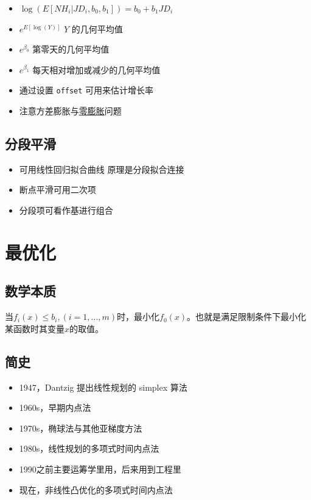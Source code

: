 \documentclass[]{book}
\providecommand{\tightlist}{%
  \setlength{\itemsep}{0pt}\setlength{\parskip}{0pt}}
\begin{document}
\begin{itemize}
\tightlist
\item
  \(\log\left(E[NH_i | JD_i, b_0, b_1]\right) = b_0 + b_1 JD_i\)
\item
  \(e^{E[\log(Y)]}\) \(Y\) 的几何平均值
\item
  \(e^{\beta_0}\) 第零天的几何平均值
\item
  \(e^{\beta_1}\) 每天相对增加或减少的几何平均值
\item
  通过设置 \texttt{offset} 可用来估计增长率
\item
  注意方差膨胀与\href{http://cran.r-project.org/web/packages/pscl/index.html}{零膨胀}问题
\end{itemize}

\section{分段平滑}

\begin{itemize}
\tightlist
\item
  可用线性回归拟合曲线 原理是分段拟合连接
\item
  断点平滑可用二次项
\item
  分段项可看作基进行组合
\end{itemize}

\chapter{最优化}

\section{数学本质}

当\(f_i(x)\leq b_i,(i = 1,...,m)\)时，最小化\(f_0(x)\)。也就是满足限制条件下最小化某函数时其变量\(x\)的取值。

\section{简史}

\begin{itemize}
\item
  1947，Dantzig 提出线性规划的 simplex 算法
\item
  1960s，早期内点法
\item
  1970s，椭球法与其他亚梯度方法
\item
  1980s，线性规划的多项式时间内点法
\item
  1990之前主要运筹学里用，后来用到工程里
\item
  现在，非线性凸优化的多项式时间内点法
\end{itemize}
\end{document}
